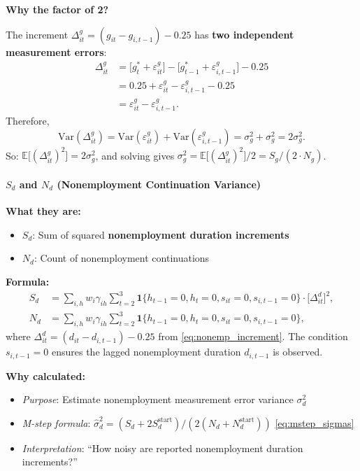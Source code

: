 \documentclass[12pt]{article}
\begin{document}
\textbf{Why the factor of 2?}

The increment $\Delta^g_{it} = (g_{it} - g_{i,t-1}) - 0.25$ has \textbf{two independent measurement errors}:
\begin{align*}
\Delta^g_{it} &= \big[g_t^* + \varepsilon^g_{it}\big] - \big[g_{t-1}^* + \varepsilon^g_{i,t-1}\big] - 0.25\\
&= 0.25 + \varepsilon^g_{it} - \varepsilon^g_{i,t-1} - 0.25\\
&= \varepsilon^g_{it} - \varepsilon^g_{i,t-1}.
\end{align*}
Therefore,
\[
\mathrm{Var}(\Delta^g_{it}) = \mathrm{Var}(\varepsilon^g_{it}) + \mathrm{Var}(\varepsilon^g_{i,t-1}) = \sigma_g^2 + \sigma_g^2 = 2\sigma_g^2.
\]
So: $\mathbb{E}\big[(\Delta^g_{it})^2\big] = 2\sigma_g^2$, and solving gives $\sigma_g^2 = \mathbb{E}\big[(\Delta^g_{it})^2\big] / 2 = S_g / (2\cdot N_g)$.

\paragraph{$S_d$ and $N_d$ (Nonemployment Continuation Variance)}

\textbf{What they are:}
\begin{itemize}
\item $S_d$: Sum of squared \textbf{nonemployment duration increments}
\item $N_d$: Count of nonemployment continuations
\end{itemize}

\textbf{Formula:}
\begin{align*}
S_d &= \sum_{i,h} w_i\gamma_{ih}\sum_{t=2}^3 \mathbf{1}\{h_{t-1}=0, h_t=0, s_{it}=0, s_{i,t-1}=0\} \cdot \big[\Delta^d_{it}\big]^2,\\
N_d &= \sum_{i,h} w_i\gamma_{ih}\sum_{t=2}^3 \mathbf{1}\{h_{t-1}=0, h_t=0, s_{it}=0, s_{i,t-1}=0\},
\end{align*}
where $\Delta^d_{it} = (d_{it} - d_{i,t-1}) - 0.25$ from \eqref{eq:nonemp_increment}. The condition $s_{i,t-1}=0$ ensures the lagged nonemployment duration $d_{i,t-1}$ is observed.

\textbf{Why calculated:}
\begin{itemize}
\item \emph{Purpose}: Estimate nonemployment measurement error variance $\sigma_d^2$
\item \emph{M-step formula}: $\hat{\sigma}_d^2 = (S_d + 2S_d^{\mathrm{start}}) / (2(N_d + N_d^{\mathrm{start}}))$ \eqref{eq:mstep_sigmas}
\item \emph{Interpretation}: ``How noisy are reported nonemployment duration increments?''
\end{itemize}
\end{document}
